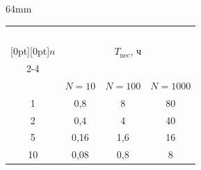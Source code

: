 \begin{floatingfigure}[t]{64mm}


\vspace*{-18pt}


{\small


\begin{center}




\vspace{2ex}





\begin{tabular}{|c|c|c|c|}


\hline


&\multicolumn{3}{c|}{\ }\\[-9pt]


\multicolumn{1}{|c|}{\raisebox{-6pt}[0pt][0pt]{$n$}}&


\multicolumn{3}{c|}{$T_{\mathrm{nec}}$, ч}\\




\cline{2-4}


&&&\\[-9pt]


&$N = 10$&$N = 100$&$N = 1000$\\


\hline


1&0,8\hphantom{9}&8\hphantom{,9}&80\\


2&0,4\hphantom{9}&4\hphantom{,9}&40\\


5&0,16&1,6&16\\


10\hphantom{9}&0,08&0,8&\hphantom{9}8\\


\hline


\end{tabular}


\end{center}}




{\small


\begin{center}




\vspace*{2ex}






\end{center}}
\end{floatingfigure}
